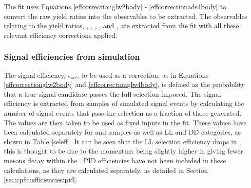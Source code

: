 The \CP fit uses Equations \ref{effcorrectionglw2body} - \ref{effcorrectionads4body} to convert the raw yield ratios into the \CP observables to be extracted. The \CP observables relating to the yield ratios, \Rkk, \Rpipi, \Rptwo,  \Rmtwo \Rpipipipi, \Rpfour and  \Rmfour, are extracted from the fit with all these relevant efficiency corrections applied.

\subsubsection{Signal efficiencies from simulation}
\label{sec:cpfit:efficiencies:signal}

The signal efficiency, $\epsilon_{sel}$, to be used as a correction, as in Equations \ref{effcorrectionglw2body} and \ref{effcorrectionglw4body}, is defined as the probability that a true signal candidate passes the full selection imposed. The signal efficiency is extracted from samples of simulated signal events by calculating the number of signal events that pass the selection as a fraction of those generated. The values are then taken to be used as fixed inputs in the \CP fit. These values have been calculated separately for \runone and \runtwo samples as well as LL and DD categories, as shown in Table \ref{seleff}. It can be seen that the LL selection efficiency drops in \runtwo, this is thought to be due to the \KS momentum being slightly higher in \runtwo giving fewer \KS mesons decay within the \velo. PID efficiencies have not been included in these calculations, as they are calculated separately, as detailed in Section \ref{sec:cpfit:efficiencies:pid}.

\begin{table}[h]
\centering
{}
\caption{Summary of the selection efficiencies used in the \CP fit.}
\label{seleff}
\end{table}

